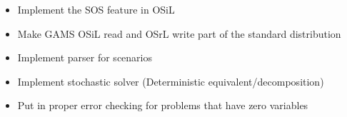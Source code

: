 %
%

\label{section:future-work}

\begin{itemize}


\item Implement the SOS feature in OSiL



\item Make GAMS OSiL read and OSrL write part of the standard distribution








\item Implement parser for scenarios

\item Implement stochastic solver (Deterministic equivalent/decomposition)

\item Put in proper error checking for problems that have zero variables



\end{itemize}

